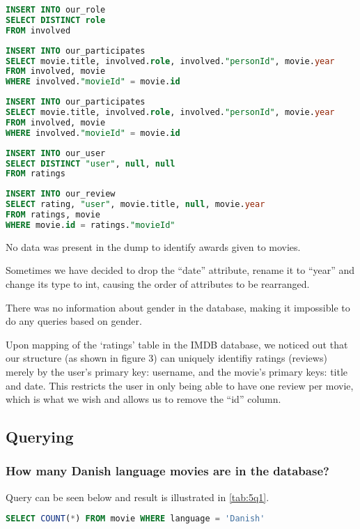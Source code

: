 \begin{lstlisting}[language=SQL]
INSERT INTO our_role
SELECT DISTINCT role
FROM involved
\end{lstlisting}

\begin{lstlisting}[language=SQL]
INSERT INTO our_participates
SELECT movie.title, involved.role, involved."personId", movie.year
FROM involved, movie
WHERE involved."movieId" = movie.id
\end{lstlisting}

\begin{lstlisting}[language=SQL]
INSERT INTO our_participates
SELECT movie.title, involved.role, involved."personId", movie.year
FROM involved, movie
WHERE involved."movieId" = movie.id
\end{lstlisting}

\begin{lstlisting}[language=SQL]
INSERT INTO our_user
SELECT DISTINCT "user", null, null
FROM ratings
\end{lstlisting}

\begin{lstlisting}[language=SQL]
INSERT INTO our_review
SELECT rating, "user", movie.title, null, movie.year
FROM ratings, movie
WHERE movie.id = ratings."movieId"
\end{lstlisting}

No data was present in the dump to identify awards given to movies.

Sometimes we have decided to drop the “date” attribute, rename it to ``year'' and change its type to int, causing the order of attributes to be rearranged.

There was no information about gender in the database, making it impossible to do any queries based on gender.

Upon mapping of the ‘ratings’ table in the IMDB database, we noticed out that our structure (as shown in figure 3) can uniquely identifiy ratings (reviews) merely by the user’s primary key: username, and the movie’s primary keys: title and date. This restricts the user in only being able to have one review per movie, which is what we wish and allows us to remove the ``id'' column.

\subsection{Querying}

\subsubsection{How many Danish language movies are in the database?}
Query can be seen below and result is illustrated in \cref{tab:5q1}.
\begin{lstlisting}[language=SQL]
SELECT COUNT(*) FROM movie WHERE language = 'Danish'
\end{lstlisting}

